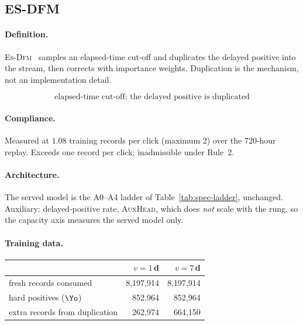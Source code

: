 \subsection{\textsc{ES-DFM}}\label{app:m-ES-DFM}

\paragraph{Definition.} \textsc{Es-Dfm}~\cite{yang2021capturing} samples an elapsed-time cut-off and duplicates
   the delayed positive into the stream, then corrects with importance weights. Duplication is the
   mechanism, not an implementation detail.

\begin{equation}
\text{elapsed-time cut-off; the delayed positive is duplicated}
\end{equation}

\begin{center}\end{center}

\paragraph{Compliance.} Measured at $1.08$ training records per click (maximum 2) over the 720-hour replay. Exceeds one record per click; inadmissible under Rule~2.

\paragraph{Architecture.} The served model is the A0--A4 ladder of Table~\ref{tab:spec-ladder}, unchanged. Auxiliary: delayed-positive rate, \textsc{AuxHead}, which does \emph{not} scale with the rung, so the capacity axis measures the served model only.

\paragraph{Training data.}
\begin{center}\small\begin{tabular}{lrr}
\toprule
 & $v=1$\,d & $v=7$\,d\\
\midrule
fresh records consumed & 8{,}197{,}914 & 8{,}197{,}914\\
hard positives ($\Yo$) & 852{,}964 & 852{,}964\\
extra records from duplication & 262{,}974 & 664{,}150\\
\bottomrule
\end{tabular}\end{center}

